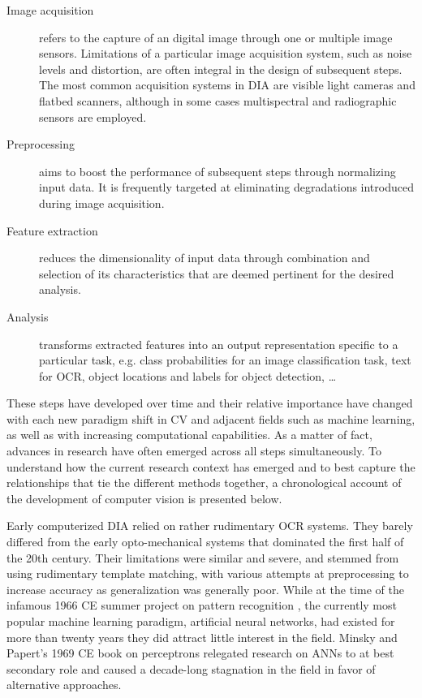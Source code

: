 \begin{description}
	\item[Image acquisition] refers to the capture of an digital image
		through one or multiple image sensors. Limitations of a
		particular image acquisition system, such as noise levels and
		distortion, are often integral in the design of subsequent
		steps. The most common acquisition systems in DIA are visible
		light cameras and flatbed scanners, although in some cases
		multispectral and radiographic sensors are employed.
	\item[Preprocessing] aims to boost the performance of subsequent steps
		through normalizing input data. It is frequently targeted at
		eliminating degradations introduced during image acquisition.
	\item[Feature extraction] reduces the dimensionality of input data
		through combination and selection of its characteristics that
		are deemed pertinent for the desired analysis. 
	\item[Analysis] transforms extracted features into an output
		representation specific to a particular task, e.g. class
		probabilities for an image classification task, text for OCR,
		object locations and labels for object detection, \dots
\end{description}

These steps have developed over time and their relative importance have changed
with each new paradigm shift in CV and adjacent fields such as machine
learning, as well as with increasing computational capabilities. As a matter of
fact, advances in research have often emerged across all steps simultaneously.
To understand how the current research context has emerged and to best capture
the relationships that tie the different methods together, a chronological
account of the development of computer vision is presented below. 

Early computerized DIA relied on rather rudimentary OCR systems. They barely
differed from the early opto-mechanical systems that dominated the first half
of the 20th century. Their limitations were similar and severe, and stemmed
from using rudimentary template matching, with various attempts at
preprocessing to increase accuracy as generalization was generally poor.
 While at the time of the infamous 1966 CE
summer project on pattern recognition \cite{papert1966summer}, the currently
most popular machine learning paradigm, artificial neural networks, had existed
for more than twenty years they did attract little interest in the field.
Minsky and Papert's 1969 CE book on perceptrons \cite{minsky1969perceptron}
relegated research on ANNs to at best secondary role and caused a decade-long
stagnation in the field in favor of alternative approaches.

